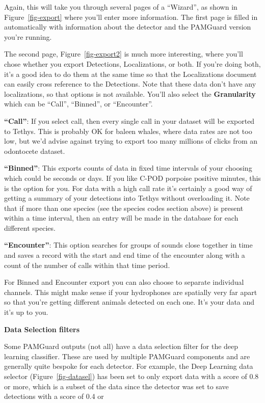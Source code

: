 \documentclass[
]{article}
\begin{document}
Again, this will take you through several pages of a ``Wizard'', as
shown in Figure~\ref{fig-export} where you'll enter more information.
The first page is filled in automatically with information about the
detector and the PAMGuard version you're running.

The second page, Figure~\ref{fig-export2} is much more interesting,
where you'll chose whether you export Detections, Localizations, or
both. If you're doing both, it's a good idea to do them at the same time
so that the Localizations document can easily cross reference to the
Detections. Note that these data don't have any localizations, so that
options is not available. You'll also select the \textbf{Granularity}
which can be ``Call'', ``Binned'', or ``Encounter''.

\textbf{``Call''}: If you select call, then every single call in your
dataset will be exported to Tethys. This is probably OK for baleen
whales, where data rates are not too low, but we'd advise against trying
to export too many millions of clicks from an odontocete dataset.

\textbf{``Binned''}: This exports counts of data in fixed time intervals
of your choosing which could be seconds or days. If you like C-POD
porpoise positive minutes, this is the option for you. For data with a
high call rate it's certainly a good way of getting a summary of your
detections into Tethys without overloading it. Note that if more than
one species (see the species codes section above) is present within a
time interval, then an entry will be made in the database for each
different species.

\textbf{``Encounter''}: This option searches for groups of sounds close
together in time and saves a record with the start and end time of the
encounter along with a count of the number of calls within that time
period.

For Binned and Encounter export you can also choose to separate
individual channels. This might make sense if your hydrophones are
spatially very far apart so that you're getting different animals
detected on each one. It's your data and it's up to you.

\textbf{Data Selection filters}

Some PAMGuard outputs (not all) have a data selection filter for the
deep learning classifier. These are used by multiple PAMGuard components
and are generally quite bespoke for each detector. For example, the Deep
Learning data selector (Figure~\ref{fig-datasel}) has been set to only
export data with a score of 0.8 or more, which is a subset of the data
since the detector was set to save detections with a score of 0.4 or
\end{document}
